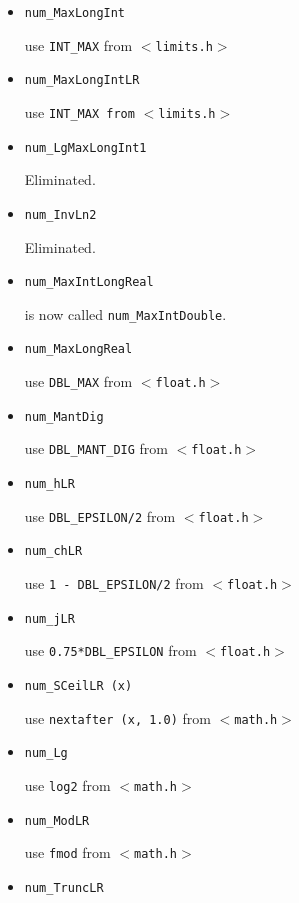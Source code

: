 \begin{itemize}

\item {\tt num\_MaxLongInt}

use {\tt INT\_MAX} from $<${\tt limits.h}$>$

\item {\tt  num\_MaxLongIntLR}

use  {\tt INT\_MAX from} $<${\tt limits.h}$>$

\item {\tt  num\_LgMaxLongInt1}

Eliminated.

\item {\tt  num\_InvLn2}

Eliminated.

\item {\tt  num\_MaxIntLongReal}

is now called {\tt num\_MaxIntDouble}.

\item {\tt  num\_MaxLongReal}

use  {\tt DBL\_MAX} from $<${\tt float.h}$>$

\item {\tt  num\_MantDig}

use  {\tt DBL\_MANT\_DIG} from $<${\tt float.h}$>$

\item {\tt  num\_hLR}

use  {\tt DBL\_EPSILON/2} from $<${\tt float.h}$>$

\item {\tt  num\_chLR}

use  {\tt 1 - DBL\_EPSILON/2} from $<${\tt float.h}$>$

\item {\tt  num\_jLR}

use  {\tt 0.75*DBL\_EPSILON} from $<${\tt float.h}$>$


\item {\tt num\_SCeilLR (x)}

use  {\tt nextafter (x, 1.0)} from $<${\tt math.h}$>$

\item {\tt  num\_Lg}

use  {\tt log2} from $<${\tt math.h}$>$

\item {\tt  num\_ModLR}

use  {\tt fmod} from $<${\tt math.h}$>$

\item {\tt num\_TruncLR}


\end{itemize}
